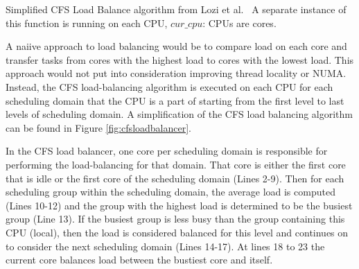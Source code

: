 \documentclass{sig-alternate}
\begin{document}
{\SetAlgoNoLine%
	\DontPrintSemicolon 
\begin{algorithm}
\Frog\;
\label{fig:cfsloadbalancer}	
\caption{Simplified CFS Load Balance algorithm from Lozi et al.~\cite{Lozi:2016} A separate instance of this function is running on each CPU, $\textit{cur\_cpu:}$ CPUs are cores.}
\end{algorithm}
}


A naiive approach to load balancing would be to compare load on each core and transfer tasks from cores with the highest load to cores with the lowest load. This approach would not put into consideration improving thread locality or NUMA. Instead, the CFS load-balancing algorithm is executed on each CPU for each scheduling domain that the CPU is a part of starting from the first level to last levels of scheduling domain. A simplification of the CFS load balancing algorithm can be found in Figure \ref{fig:cfsloadbalancer}.

In the CFS load balancer, one core per scheduling domain is responsible for performing the load-balancing for that domain. That core is either the first core that is idle or the first core of the scheduling domain (Lines 2-9). Then for each scheduling group within the scheduling domain, the average load is computed (Lines 10-12) and the group with the highest load is determined to be the busiest group (Line 13). If the busiest group is less busy than the group containing this CPU (local), then the load is considered balanced for this level and continues on to consider the next scheduling domain (Lines 14-17). At lines 18 to 23 the current core balances load between the bustiest core and itself.~\cite{Lozi:2016}
\end{document}
